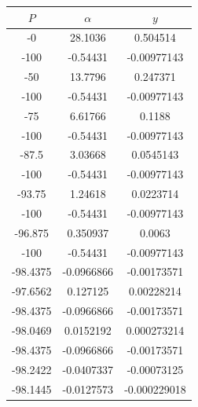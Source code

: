 \documentclass[a4paper,14pt]{extarticle}
\begin{document}
\begin{enumerate}[1. ]
          \begin{center}
              \begin{tabular}{|c|c|c|}
                  \hline
                  $P$      & $\alpha$     & $y$          \\
                  \hline
                  -0       & 28.1036      & 0.504514     \\
                  \hline
                  -100     & -0.54431     & -0.00977143  \\
                  \hline
                  -50      & 13.7796      & 0.247371     \\
                  \hline
                  -100     & -0.54431     & -0.00977143  \\
                  \hline
                  -75      & 6.61766      & 0.1188       \\
                  \hline
                  -100     & -0.54431     & -0.00977143  \\
                  \hline
                  -87.5    & 3.03668      & 0.0545143    \\
                  \hline
                  -100     & -0.54431     & -0.00977143  \\
                  \hline
                  -93.75   & 1.24618      & 0.0223714    \\
                  \hline
                  -100     & -0.54431     & -0.00977143  \\
                  \hline
                  -96.875  & 0.350937     & 0.0063       \\
                  \hline
                  -100     & -0.54431     & -0.00977143  \\
                  \hline
                  -98.4375 & -0.0966866   & -0.00173571  \\
                  \hline
                  -97.6562 & 0.127125     & 0.00228214   \\
                  \hline
                  -98.4375 & -0.0966866   & -0.00173571  \\
                  \hline
                  -98.0469 & 0.0152192    & 0.000273214  \\
                  \hline
                  -98.4375 & -0.0966866   & -0.00173571  \\
                  \hline
                  -98.2422 & -0.0407337   & -0.00073125  \\
                  \hline
                  -98.1445 & -0.0127573   & -0.000229018 \\

\end{tabular}
\end{center}
\end{enumerate}
\end{document}
